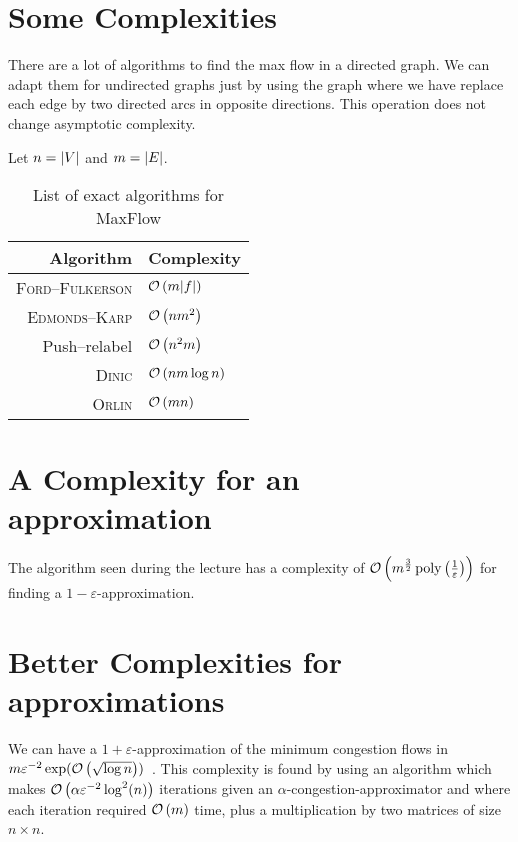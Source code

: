 \section{Some Complexities}

There are a lot of algorithms to find the max flow in a directed graph. We can adapt them for undirected graphs just by using the graph where we have replace each edge by two directed arcs in opposite directions. This operation does not change asymptotic complexity.

Let $n = \left\lvert V \right\rvert$ and $m = \left\lvert E \right\rvert$.

\begin{table}[!ht]
    \centering
    \begin{tabular}{rl}
        Algorithm & Complexity\\
        \hline
        \textsc{Ford–Fulkerson} & $\mathcal{O}\left(m\lvert f\rvert\right)$\\
        \textsc{Edmonds–Karp} & $\mathcal{O}\left(nm^2\right)$\\
        Push–relabel & $\mathcal{O}\left(n^2m\right)$\\
        \textsc{Dinic} & $\mathcal{O}\left(nm\log n\right)$\\
        \textsc{Orlin} &  $\mathcal{O}\left(mn\right)$
    \end{tabular}
    \caption{List of exact algorithms for MaxFlow}
\end{table}


\section{A Complexity for an approximation}

The algorithm seen during the lecture has a complexity of $\mathcal{O}\left(m^\frac{3}{2} \operatorname{poly}\left(\frac{1}{\varepsilon}\right)\right)$ for finding a $1-\varepsilon$-approximation.

\section{Better Complexities for approximations}

We can have a $1+\varepsilon$-approximation of the minimum congestion flows in $m\varepsilon^{-2}\exp(\mathcal{O}\left(\sqrt{\log n}\right))$~\cite{sherman2013nearly}. This complexity is found by using an algorithm which makes $\mathcal{O}\left(\alpha \varepsilon^{-2}\log^2(n)\right)$ iterations given an $\alpha$-congestion-approximator and where each iteration required $\mathcal{O}\left(m\right)$ time, plus a multiplication by two matrices of size $n\times n$.


